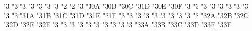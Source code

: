 \mathchardef \mappedfromchar   "3
\mathchardef \Mapstochar   "3
\mathchardef \Mappedfromchar   "3
\mathchardef \mmapstochar   "3
\mathchardef \mmappedfromchar   "3
\mathchardef \Mmapstochar   "3
\mathchardef \Mmappedfromchar   "3
\mathchardef \medcirc   "2
\mathchardef \medbullet   "2
\mathchardef \varparallel   "3
\mathchardef \varparallelinv   "3\txsycfam 0A
\mathchardef \nvarparallel   "3\txsycfam 0B
\mathchardef \nvarparallelinv   "3\txsycfam 0C
\mathchardef \colonapprox   "3\txsycfam 0D
\mathchardef \colonsim   "3\txsycfam 0E
\mathchardef \Colonapprox   "3\txsycfam 0F
\mathchardef \Colonsim   "3
\mathchardef \doteq   "3
\mathchardef \multimapinv   "3
\mathchardef \multimapboth   "3
\mathchardef \multimapdot   "3
\mathchardef \multimapdotinv   "3
\mathchardef \multimapdotboth   "3
\mathchardef \multimapdotbothA   "3
\mathchardef \multimapdotbothB   "3
\mathchardef \VDash   "3
\mathchardef \VvDash   "3\txsycfam 1A
\mathchardef \cong   "3\txsycfam 1B
\mathchardef \preceqq   "3\txsycfam 1C
\mathchardef \succeqq   "3\txsycfam 1D
\mathchardef \nprecsim   "3\txsycfam 1E
\mathchardef \nsuccsim   "3\txsycfam 1F
\mathchardef \nlesssim   "3
\mathchardef \ngtrsim   "3
\mathchardef \nlessapprox   "3
\mathchardef \ngtrapprox   "3
\mathchardef \npreccurlyeq   "3
\mathchardef \nsucccurlyeq   "3
\mathchardef \ngtrless   "3
\mathchardef \nlessgtr   "3
\mathchardef \nbumpeq   "3
\mathchardef \nBumpeq   "3
\mathchardef \nbacksim   "3\txsycfam 2A
\mathchardef \nbacksimeq   "3\txsycfam 2B
\mathchardef \neq   "3\txsycfam 2C
\mathchardef \nasymp   "3\txsycfam 2D
\mathchardef \nequiv   "3\txsycfam 2E
\mathchardef \nsim   "3\txsycfam 2F
\mathchardef \napprox   "3
\mathchardef \nsubset   "3
\mathchardef \nsupset   "3
\mathchardef \nll   "3
\mathchardef \ngg   "3
\mathchardef \nthickapprox   "3
\mathchardef \napproxeq   "3
\mathchardef \nprecapprox   "3
\mathchardef \nsuccapprox   "3
\mathchardef \npreceqq   "3
\mathchardef \nsucceqq   "3\txsycfam 3A
\mathchardef \nsimeq   "3\txsycfam 3B
\mathchardef \notin   "3\txsycfam 3C
\mathchardef \notni   "3\txsycfam 3D
\mathchardef \nSubset   "3\txsycfam 3E
\mathchardef \nSupset   "3\txsycfam 3F
